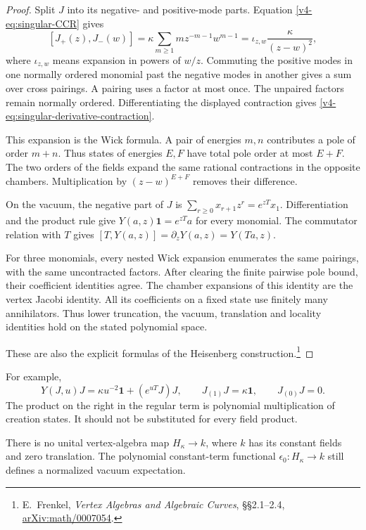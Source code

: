 \begin{proof}
Split \(J\) into its negative- and positive-mode parts.
Equation \eqref{v4-eq:singular-CCR} gives
\[
 [J_+(z),J_-(w)]
     =\kappa\sum_{m\geq1}m z^{-m-1}w^{m-1}
     =\iota_{z,w}\frac{\kappa}{(z-w)^2},
\]
where \(\iota_{z,w}\) means expansion in powers of
\(w/z\). Commuting the positive modes in one normally
ordered monomial past the negative modes in another
gives a sum over cross pairings. A pairing uses a factor
at most once. The unpaired factors remain normally
ordered. Differentiating the displayed contraction
gives \eqref{v4-eq:singular-derivative-contraction}.

This expansion is the Wick formula. A pair
of energies \(m,n\) contributes a pole of
order \(m+n\). Thus states of energies \(E,F\)
have total pole order at most \(E+F\).
The two orders of the fields expand the same rational
contractions in the opposite chambers. Multiplication
by \((z-w)^{E+F}\) removes their difference.

On the vacuum, the negative part of \(J\) is
\(\sum_{r\geq0}x_{r+1}z^r=e^{zT}x_1\).
Differentiation and the product rule give
\(Y(a,z)\mathbf1=e^{zT}a\) for every monomial.
The commutator relation with \(T\) gives
\([T,Y(a,z)]=\partial_zY(a,z)=Y(Ta,z)\).

For three monomials, every nested Wick expansion
enumerates the same pairings, with the same
uncontracted factors. After clearing the finite
pairwise pole bound, their coefficient identities
agree. The chamber expansions of this identity are
the vertex Jacobi identity. All its coefficients
on a fixed state use finitely many annihilators.
Thus lower truncation, the vacuum, translation and
locality identities hold on the stated polynomial
space.

These are also the explicit formulas of the
Heisenberg construction.\footnote{E.~Frenkel,
\emph{Vertex Algebras and Algebraic Curves},
\S\S2.1--2.4,
\href{https://arxiv.org/abs/math/0007054}{arXiv:math/0007054}.}
\end{proof}

For example,
\[
 Y(J,u)J=\kappa u^{-2}\mathbf1+(e^{uT}J)J,
 \qquad J_{(1)}J=\kappa\mathbf1,
 \qquad J_{(0)}J=0.
\]
The product on the right in the regular term is
polynomial multiplication of creation states.
It should not be substituted for every field product.

\begin{proposition}\label{v4-prop:singular-no-augmentation}
There is no unital vertex-algebra map \(H_\kappa\to k\),
where \(k\) has its constant fields and zero translation.
The polynomial constant-term functional
\(\epsilon_0:H_\kappa\to k\) still defines a normalized
vacuum expectation.
\end{proposition}

